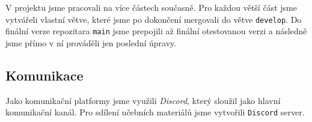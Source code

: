V projektu jsme pracovali na více částech současně.
Pro každou větší část jsme vytvářeli vlastní větve, které jsme po dokončení mergovali do větve \texttt{develop}.
Do finální verze repozitara \texttt{main} jsme prepojili až finální otestovanou verzi a následně jsme přímo v ní prováděli jen poslední úpravy.

\subsection{Komunikace}
Jako komunikační platformy jsme využili \textit{Discord}, který sloužil jako hlavní komunikační kanál.
Pro sdílení učebních materiálů jsme vytvořili \texttt{Discord} server.